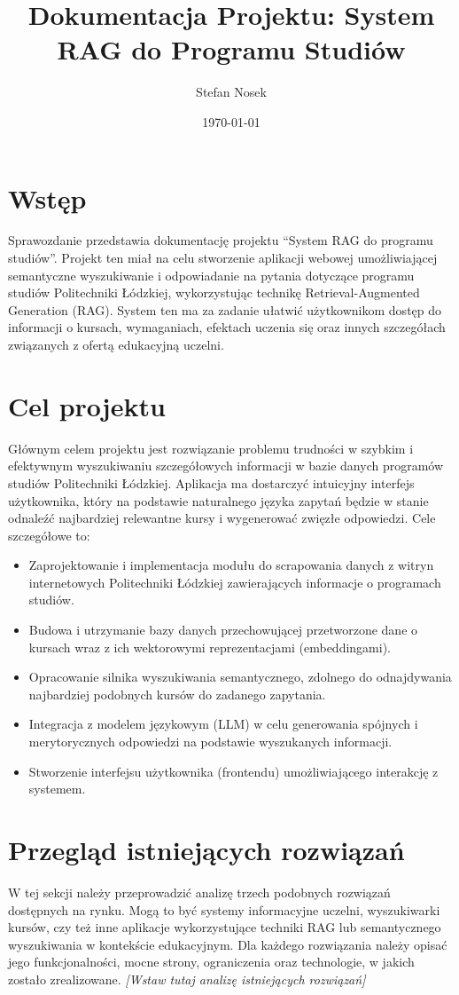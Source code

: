 \documentclass{article}
\title{Dokumentacja Projektu: System RAG do Programu Studiów}
\author{Stefan Nosek}
\date{\today}
\begin{document}
\maketitle

\tableofcontents
\newpage

\section{Wstęp}
Sprawozdanie przedstawia dokumentację projektu ``System RAG do programu studiów''. Projekt ten miał na celu stworzenie aplikacji webowej umożliwiającej semantyczne wyszukiwanie i odpowiadanie na pytania dotyczące programu studiów Politechniki Łódzkiej, wykorzystując technikę Retrieval-Augmented Generation (RAG). System ten ma za zadanie ułatwić użytkownikom dostęp do informacji o kursach, wymaganiach, efektach uczenia się oraz innych szczegółach związanych z ofertą edukacyjną uczelni.

\section{Cel projektu}
Głównym celem projektu jest rozwiązanie problemu trudności w szybkim i efektywnym wyszukiwaniu szczegółowych informacji w bazie danych programów studiów Politechniki Łódzkiej. Aplikacja ma dostarczyć intuicyjny interfejs użytkownika, który na podstawie naturalnego języka zapytań będzie w stanie odnaleźć najbardziej relewantne kursy i wygenerować zwięzłe odpowiedzi. Cele szczegółowe to:
\begin{itemize}
    \item Zaprojektowanie i implementacja modułu do scrapowania danych z witryn internetowych Politechniki Łódzkiej zawierających informacje o programach studiów.
    \item Budowa i utrzymanie bazy danych przechowującej przetworzone dane o kursach wraz z ich wektorowymi reprezentacjami (embeddingami).
    \item Opracowanie silnika wyszukiwania semantycznego, zdolnego do odnajdywania najbardziej podobnych kursów do zadanego zapytania.
    \item Integracja z modelem językowym (LLM) w celu generowania spójnych i merytorycznych odpowiedzi na podstawie wyszukanych informacji.
    \item Stworzenie interfejsu użytkownika (frontendu) umożliwiającego interakcję z systemem.
\end{itemize}

\section{Przegląd istniejących rozwiązań}
W tej sekcji należy przeprowadzić analizę trzech podobnych rozwiązań dostępnych na rynku. Mogą to być systemy informacyjne uczelni, wyszukiwarki kursów, czy też inne aplikacje wykorzystujące techniki RAG lub semantycznego wyszukiwania w kontekście edukacyjnym. Dla każdego rozwiązania należy opisać jego funkcjonalności, mocne strony, ograniczenia oraz technologie, w jakich zostało zrealizowane.
\textit{[Wstaw tutaj analizę istniejących rozwiązań]}
\end{document}
